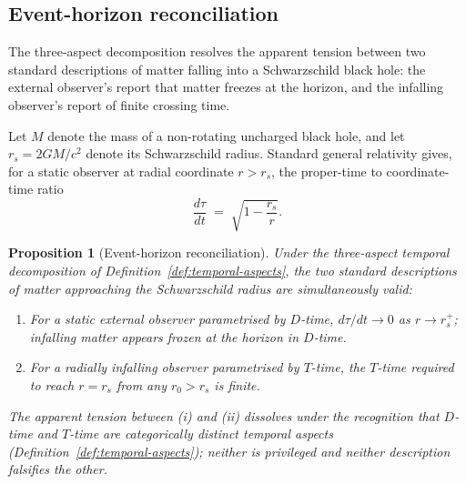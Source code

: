 \documentclass[11pt,a4paper]{article}
\newtheorem{proposition}[theorem]{Proposition}
\theoremstyle{definition}
\theoremstyle{remark}
\begin{document}
\subsection{Event-horizon reconciliation}\label{subsec:horizon}

The three-aspect decomposition resolves the apparent tension between two standard descriptions of matter falling into a Schwarzschild black hole: the external observer's report that matter freezes at the horizon, and the infalling observer's report of finite crossing time.

Let $M$ denote the mass of a non-rotating uncharged black hole, and let $r_{s} = 2GM/c^{2}$ denote its Schwarzschild radius. Standard general relativity gives, for a static observer at radial coordinate $r > r_{s}$, the proper-time to coordinate-time ratio
\begin{equation}\label{eq:schwarzschild-ratio}
\frac{d\tau}{dt} \;=\; \sqrt{1 - \frac{r_{s}}{r}}.
\end{equation}

\begin{proposition}[Event-horizon reconciliation]\label{prop:horizon}
Under the three-aspect temporal decomposition of Definition~\ref{def:temporal-aspects}, the two standard descriptions of matter approaching the Schwarzschild radius are simultaneously valid:
\begin{enumerate}[leftmargin=*,label=(\roman*)]
\item For a static external observer parametrised by $D$-time, $d\tau/dt \to 0$ as $r \to r_{s}^{+}$; infalling matter appears frozen at the horizon in $D$-time.
\item For a radially infalling observer parametrised by $T$-time, the $T$-time required to reach $r = r_{s}$ from any $r_{0} > r_{s}$ is finite.
\end{enumerate}
The apparent tension between (i) and (ii) dissolves under the recognition that $D$-time and $T$-time are categorically distinct temporal aspects (Definition~\ref{def:temporal-aspects}); neither is privileged and neither description falsifies the other.
\end{proposition}
\end{document}
